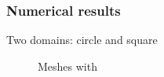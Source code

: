 \documentclass[12pt,a4paper,handout]{beamer}
\theoremstyle{definition}
\theoremstyle{plain}
\begin{document}
\begin{frame}
    \frametitle{Numerical results}
    Two domains: circle and square
    \begin{figure}
        \caption{Meshes with }
    \end{figure}
\end{frame}
\end{document}
